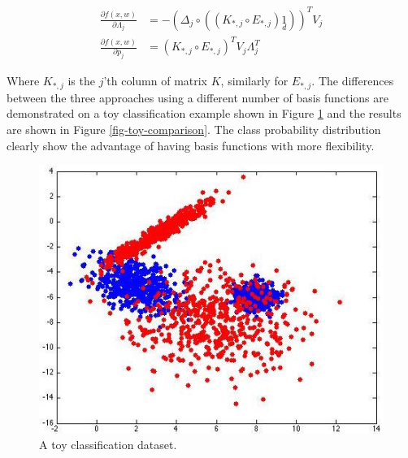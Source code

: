 \documentclass[useAMS,usenatbib,fleqn]{mn2e}
\begin{document}
\begin{subequations}
\begin{align} 
\label{eq-dfdL}
\frac{\partial f(x,w)}{\partial \Lambda_{j}} &= -\left( \Delta_{j}\circ \left(\left(K_{*,j}\circ E_{*,j}\right)\underset{d}{1}\right) \right)^{T}V_{j}\\
\label{eq-dfdP}
\frac{\partial f(x,w)}{\partial p_{j}} &= \left( K_{*,j}\circ E_{*,j} \right)^{T}V_{j}\Lambda_{j}^{T}
\end{align}
\end{subequations}

Where $K_{*,j}$ is the $j$'th column of matrix $K$, similarly for $E_{*,j}$. The differences between the three approaches using a different number of basis functions are demonstrated on a toy classification example shown in Figure \ref{fig-toy-example} and the results are shown in Figure \ref{fig-toy-comparison}. The class probability distribution clearly show the advantage of having basis functions with more flexibility. 

\begin{figure}
       \centering
       \includegraphics[trim = 25px 12px 10px 10px, clip=true,width=0.75\columnwidth]{clouds.jpg}
        \caption{A toy classification dataset. }       
       \label{fig-toy-example}
\end{figure}
  
\end{document}
